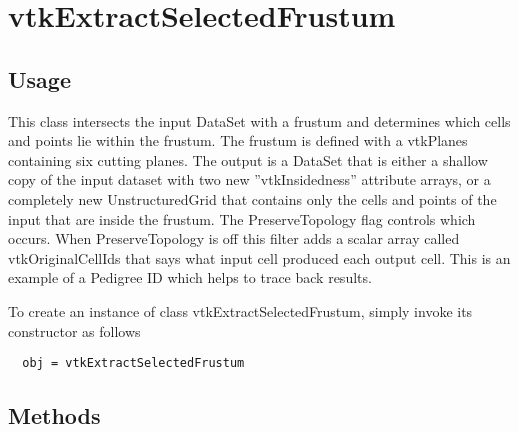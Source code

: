 \section{vtkExtractSelectedFrustum}

\subsection{Usage}

 This class intersects the input DataSet with a frustum and determines which
 cells and points lie within the frustum. The frustum is defined with a 
 vtkPlanes containing six cutting planes. The output is a DataSet that is 
 either a shallow copy of the input dataset with two new ''vtkInsidedness'' 
 attribute arrays, or a completely new UnstructuredGrid that contains only 
 the cells and points of the input that are inside the frustum. The 
 PreserveTopology flag controls which occurs. When PreserveTopology is off 
 this filter adds a scalar array called vtkOriginalCellIds that says what 
 input cell produced each output cell. This is an example of a Pedigree ID 
 which helps to trace back results.


To create an instance of class vtkExtractSelectedFrustum, simply
invoke its constructor as follows
\begin{verbatim}
  obj = vtkExtractSelectedFrustum
\end{verbatim}
\subsection{Methods}

